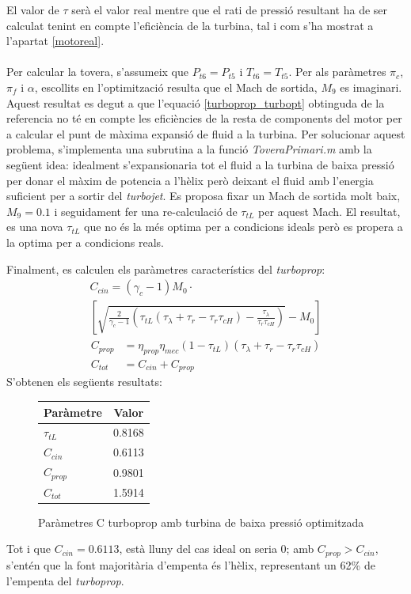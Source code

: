 \noindent El valor de $\tau$ serà el valor real mentre que el rati de pressió resultant ha de ser calculat tenint en compte l'eficiència de la turbina, tal i com s'ha mostrat a l'apartat \ref{motoreal}. \\
\\
Per calcular la tovera, s'assumeix que $P_{t6}=P_{t5}$ i $T_{t6}=T_{t5}$. Per als paràmetres $\pi_c$, $\pi_f$ i $\alpha$, escollits en l'optimització resulta que el Mach de sortida, $M_9$ es imaginari. Aquest resultat es degut a que l'equació \ref{turboprop_turbopt} obtinguda de la referencia \cite{mattingly} no té en compte les eficiències de la resta de components del motor per a calcular el punt de màxima expansió de fluid a la turbina.  
\noindent Per solucionar aquest problema, s'implementa una subrutina a la funció \textit{ToveraPrimari.m} amb la següent idea: idealment s'expansionaria tot el fluid a la turbina de baixa pressió per donar el màxim de potencia a l'hèlix però deixant el fluid amb l'energia suficient per a sortir del \textit{turbojet}. Es proposa fixar un Mach de sortida molt baix, $M_9 = 0.1$ i seguidament fer una  re-calculació de $\tau_{tL}$ per aquest Mach. El resultat, es una nova $\tau_{tL}$ que no és la més optima per a condicions ideals però es propera a la optima per a condicions reals.

\noindent Finalment, es calculen els paràmetres característics del \textit{turboprop}:
\begin{multline}
	C_{cin} = (\gamma_c-1)M_0\cdot\\
	\left[\sqrt{\frac{2}{\gamma_c-1}\left(\tau_{tL}(\tau_{\lambda}+\tau_r-\tau_r\tau_{cH})-\frac{\tau_{\lambda}}{\tau_r\tau_{cH}}\right)}-M_0\right] \label{turboprop_eqn1}
\end{multline}
	\begin{align}
	C_{prop} &= \eta_{prop}\eta_{mec}(1-\tau_{tL})(\tau_\lambda+\tau_r-\tau_r\tau_{cH}) \label{turboprop_eqn2}\\
	C_{tot} &= C_{cin} + C_{prop} \label{turboprop_eqn3}
	\end{align}
S'obtenen els següents resultats:
\begin{figure}[H]
	\centering
	\begin{tabular}{lc}
		\toprule[3pt]
		\textbf{Paràmetre}&\textbf{Valor}\\
		\midrule[1pt]
		$\tau_{tL}$ & 0.8168\\
		$C_{cin}$ & 0.6113\\
		$C_{prop}$ & 0.9801\\
		$C_{tot}$ & 1.5914\\
		
		\bottomrule[2pt]
	\end{tabular}
\label{C_opti}
\caption{Paràmetres C turboprop amb turbina de baixa pressió optimitzada}
\end{figure}
\noindent Tot i que $C_{cin}=0.6113$, està lluny del cas ideal on seria 0; amb $C_{prop}>C_{cin}$, s'entén que la font majoritària d'empenta és l'hèlix, representant un 62\% de l'empenta del \textit{turboprop}.

